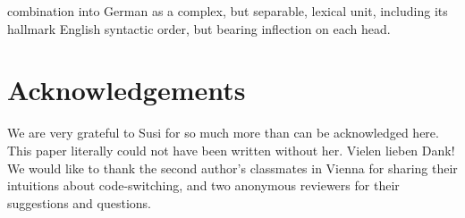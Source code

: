 \documentclass[output=paper]{langscibook}
\begin{document}
combination into German as a complex, but separable, lexical unit, including its hallmark English syntactic order, but bearing inflection on each head. 






\section*{Acknowledgements}
We are very grateful to Susi for so much more than can be acknowledged here. This paper literally could not have been written without her. Vielen lieben Dank! We would like to thank the second author's classmates in Vienna for sharing their intuitions about code-switching, and two anonymous reviewers for their suggestions and questions.

\sloppy
\printbibliography[heading=subbibliography,notkeyword=this]
\end{document}

